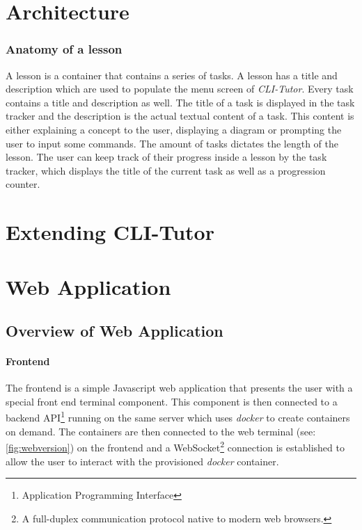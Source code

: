 \section{Architecture}

\subsubsection{Anatomy of a lesson} A lesson is a container that contains a
series of tasks. A lesson has a title and description which are used to
populate the menu screen of \textit{CLI-Tutor}. Every task contains a title and
description as well. The title of a task is displayed in the task tracker and
the description is the actual textual content of a task. This content is either
explaining a concept to the user, displaying a diagram or prompting the user to
input some commands. The amount of tasks dictates the length of the lesson. The
user can keep track of their progress inside a lesson by the task tracker,
which displays the title of the current task as well as a progression counter.

\section{Extending CLI-Tutor}


\section{Web Application}



\subsection{Overview of Web Application}

\paragraph{Frontend} The frontend is a simple Javascript web application that
presents the user with a special front end terminal component. This component
is then connected to a backend API\footnote{Application Programming Interface}
running on the same server which uses \textit{docker} to create containers on
demand. The containers are then connected to the web terminal (see: \autoref{fig:webversion}) on the frontend
and a WebSocket\footnote{A full-duplex communication protocol native to modern
web browsers.} connection is established to allow the user to interact
with the provisioned \textit{docker} container.

